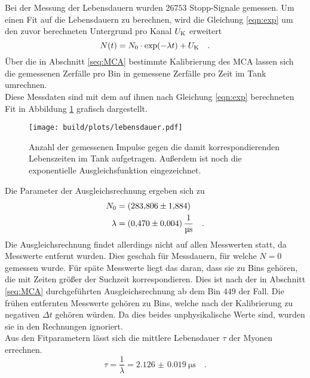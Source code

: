 \noindent
Bei der Messung der Lebensdauern wurden $26753$ Stopp-Signale gemessen. 
Um einen Fit auf die Lebensdauern zu berechnen, wird die Gleichung \ref{eqn:exp} um den zuvor berechneten Untergrund pro Kanal $U_{\text{K}}$ erweitert
\begin{equation}
  N(t)=N_0\cdot \exp({-\lambda t})+U_{\text{K}} \quad .
  \label{eqn:expfit} 
\end{equation}
Über die in Abschnitt \ref{seq:MCA} bestimmte Kalibrierung des MCA lassen sich die gemessenen Zerfälle pro Bin in gemessene Zerfälle pro Zeit im Tank umrechnen.\\
Diese Messdaten sind mit dem auf ihnen nach Gleichung \ref{eqn:exp} berechneten Fit in Abbildung \ref{img:lebensdauer} grafisch dargestellt.

\begin{figure}[H]
  \centering
  \texttt{[image: build/plots/lebensdauer.pdf]}
  \caption{Anzahl der gemessenen Impulse gegen die damit korrespondierenden Lebenszeiten im Tank aufgetragen. Außerdem ist noch die exponentielle Ausgleichsfunktion eingezeichnet.}
  \label{img:lebensdauer}
\end{figure}
\noindent
Die Parameter der Ausgleichsrechnung ergeben sich zu
\begin{align*}
  N_0    &=\SI{283.806 (1884)}{} \\
  \lambda&=\SI{0.470(0004)}{\per\micro\second} \quad .
\end{align*}
Die Ausgleichsrechnung findet allerdings nicht auf allen Messwerten statt, da Messwerte entfernt wurden.
Dies geschah für Messdauern, für welche $N=0$ gemessen wurde.
Für späte Messwerte liegt das daran, dass sie zu Bins gehören, die mit Zeiten größer der Suchzeit korrespondieren.
Dies ist nach der in Abschnitt \ref{seq:MCA} durchgeführten Ausgleichsrechnung ab dem Bin $449$ der Fall. 
Die frühen entfernten Messwerte gehören zu Bins, welche nach der Kalibrierung zu negativen $\Delta t$ gehören würden.  
Da dies beides unphysikalische Werte sind, wurden sie in den Rechnungen ignoriert.\\
Aus den Fitparametern lässt sich die mittlere Lebensdauer $\tau$ der Myonen errechnen.
\begin{equation*}
  \tau= \frac{1}{\lambda} = \SI{2.126(0019)}{\micro\second} \quad .
\end{equation*}
